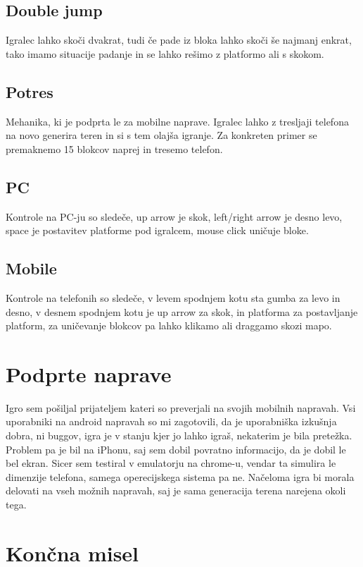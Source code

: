 \documentclass[a4paper,11pt]{article}
\begin{document}
\subsection{Double jump}
Igralec lahko skoči dvakrat, tudi če pade iz bloka lahko skoči še najmanj enkrat, tako imamo situacije padanje in se lahko rešimo z platformo ali s skokom.

\subsection{Potres}
Mehanika, ki je podprta le za mobilne naprave. Igralec lahko z tresljaji telefona na novo generira teren in si s tem olajša igranje. Za konkreten primer se premaknemo 15 blokcov naprej in tresemo telefon.

\subsection{PC}
Kontrole na PC-ju so sledeče, up arrow je skok, left/right arrow je desno levo, space je postavitev platforme pod igralcem, mouse click uničuje bloke.

\subsection{Mobile}
Kontrole na telefonih so sledeče, v levem spodnjem kotu sta gumba za levo in desno, v desnem spodnjem kotu je up arrow za skok, in platforma za postavljanje platform, za uničevanje blokcov pa lahko klikamo ali draggamo skozi mapo.

\section{Podprte naprave}

Igro sem pošiljal prijateljem kateri so preverjali na svojih mobilnih napravah. Vsi uporabniki na android napravah so mi zagotovili, da je uporabniška izkušnja dobra, ni buggov, igra je v stanju kjer jo lahko igraš, nekaterim je bila pretežka. Problem pa je bil na iPhonu, saj sem dobil povratno informacijo, da je dobil le bel ekran. Sicer sem testiral v emulatorju na chrome-u, vendar ta simulira le dimenzije telefona, samega operecijskega sistema pa ne. Načeloma igra bi morala delovati na vseh možnih napravah, saj je sama generacija terena narejena okoli tega.

\section{Končna misel}
\end{document}
